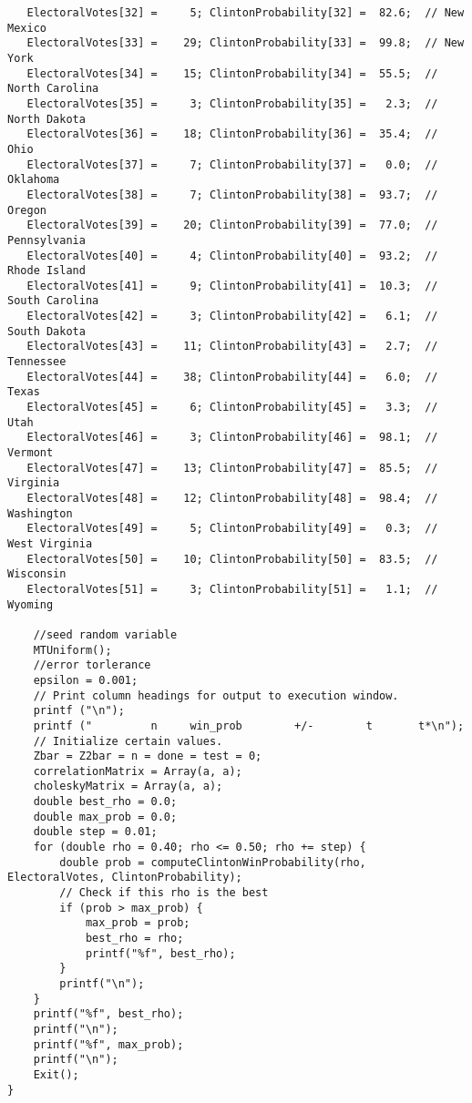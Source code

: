 \documentclass{report}
\begin{document}
\begin{lstlisting}
   ElectoralVotes[32] =     5; ClintonProbability[32] =  82.6;  // New Mexico
   ElectoralVotes[33] =    29; ClintonProbability[33] =  99.8;  // New York
   ElectoralVotes[34] =    15; ClintonProbability[34] =  55.5;  // North Carolina
   ElectoralVotes[35] =     3; ClintonProbability[35] =   2.3;  // North Dakota
   ElectoralVotes[36] =    18; ClintonProbability[36] =  35.4;  // Ohio
   ElectoralVotes[37] =     7; ClintonProbability[37] =   0.0;  // Oklahoma
   ElectoralVotes[38] =     7; ClintonProbability[38] =  93.7;  // Oregon
   ElectoralVotes[39] =    20; ClintonProbability[39] =  77.0;  // Pennsylvania
   ElectoralVotes[40] =     4; ClintonProbability[40] =  93.2;  // Rhode Island
   ElectoralVotes[41] =     9; ClintonProbability[41] =  10.3;  // South Carolina
   ElectoralVotes[42] =     3; ClintonProbability[42] =   6.1;  // South Dakota
   ElectoralVotes[43] =    11; ClintonProbability[43] =   2.7;  // Tennessee
   ElectoralVotes[44] =    38; ClintonProbability[44] =   6.0;  // Texas
   ElectoralVotes[45] =     6; ClintonProbability[45] =   3.3;  // Utah
   ElectoralVotes[46] =     3; ClintonProbability[46] =  98.1;  // Vermont
   ElectoralVotes[47] =    13; ClintonProbability[47] =  85.5;  // Virginia
   ElectoralVotes[48] =    12; ClintonProbability[48] =  98.4;  // Washington
   ElectoralVotes[49] =     5; ClintonProbability[49] =   0.3;  // West Virginia
   ElectoralVotes[50] =    10; ClintonProbability[50] =  83.5;  // Wisconsin
   ElectoralVotes[51] =     3; ClintonProbability[51] =   1.1;  // Wyoming

    //seed random variable
    MTUniform();
    //error torlerance
    epsilon = 0.001;
    // Print column headings for output to execution window.
    printf ("\n");
    printf ("         n     win_prob        +/-        t       t*\n");
    // Initialize certain values.
    Zbar = Z2bar = n = done = test = 0;
    correlationMatrix = Array(a, a);
    choleskyMatrix = Array(a, a);
    double best_rho = 0.0;
    double max_prob = 0.0;
    double step = 0.01;
    for (double rho = 0.40; rho <= 0.50; rho += step) {
        double prob = computeClintonWinProbability(rho, ElectoralVotes, ClintonProbability);
        // Check if this rho is the best
        if (prob > max_prob) {
            max_prob = prob;
            best_rho = rho;
            printf("%f", best_rho);
        }
        printf("\n");
    }
    printf("%f", best_rho);
    printf("\n");
    printf("%f", max_prob);
    printf("\n");
    Exit();
}
\end{lstlisting}
\end{document}
